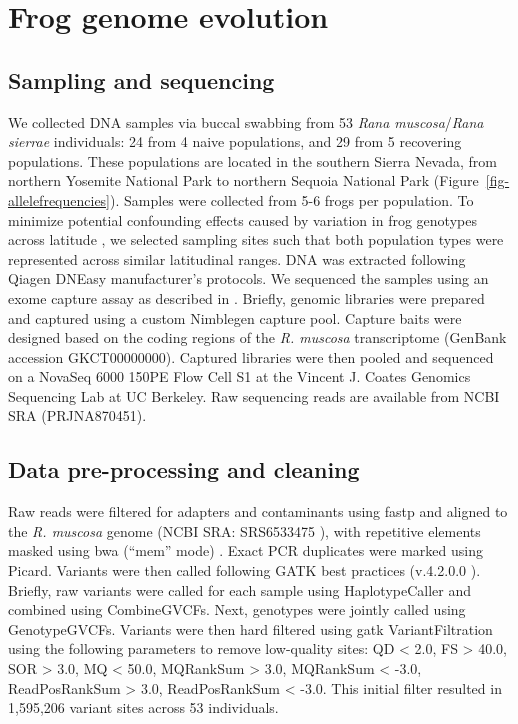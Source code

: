 \documentclass[9pt,twocolumn,twoside,lineno]{pnas-new}
\begin{document}
{\hypertarget{frog-genome-evolution-1}{%
\section*{Frog genome evolution}\label{frog-genome-evolution-1}}

\hypertarget{sampling-and-sequencing}{%
\subsection*{Sampling and sequencing}\label{sampling-and-sequencing}}

We collected DNA samples via buccal swabbing \citep{broquet2007} from 53
\emph{Rana muscosa}/\emph{Rana sierrae} individuals: 24 from 4 naive
populations, and 29 from 5 recovering populations. These populations are
located in the southern Sierra Nevada, from northern Yosemite National
Park to northern Sequoia National Park
(Figure~\ref{fig-allelefrequencies}). Samples were collected from 5-6
frogs per population. To minimize potential confounding effects caused
by variation in frog genotypes across latitude \citep{byrne2023}, we
selected sampling sites such that both population types were represented
across similar latitudinal ranges. DNA was extracted following Qiagen
DNEasy manufacturer's protocols. We sequenced the samples using an exome
capture assay as described in \citep{byrne2023}. Briefly, genomic
libraries were prepared and captured using a custom Nimblegen capture
pool. Capture baits were designed based on the coding regions of the
\emph{R. muscosa} transcriptome (GenBank accession GKCT00000000).
Captured libraries were then pooled and sequenced on a NovaSeq 6000
150PE Flow Cell S1 at the Vincent J. Coates Genomics Sequencing Lab at
UC Berkeley. Raw sequencing reads are available from NCBI SRA
(PRJNA870451).

\hypertarget{data-pre-processing-and-cleaning}{%
\subsection*{Data pre-processing and
cleaning}\label{data-pre-processing-and-cleaning}}

Raw reads were filtered for adapters and contaminants using fastp
\citep{chen2018} and aligned to the \emph{R. muscosa} genome (NCBI SRA:
SRS6533475 \citep{hon2020}), with repetitive elements masked using bwa
(``mem'' mode) \citep{li2013}. Exact PCR duplicates were marked using
Picard. Variants were then called following GATK best practices
(v.4.2.0.0 \citep{van2020}). Briefly, raw variants were called for each
sample using HaplotypeCaller and combined using CombineGVCFs. Next,
genotypes were jointly called using GenotypeGVCFs. Variants were then
hard filtered using gatk VariantFiltration using the following
parameters to remove low-quality sites: QD \textless{} 2.0, FS
\textgreater{} 40.0, SOR \textgreater{} 3.0, MQ \textless{} 50.0,
MQRankSum \textgreater{} 3.0, MQRankSum \textless{} -3.0, ReadPosRankSum
\textgreater{} 3.0, ReadPosRankSum \textless{} -3.0. This initial filter
resulted in 1,595,206 variant sites across 53 individuals.

}
\end{document}
